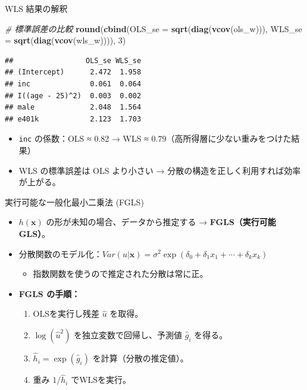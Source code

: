 \documentclass[
  ignorenonframetext,
]{beamer}
\newenvironment{Shaded}{\begin{snugshade}}{\end{snugshade}}
\newcommand{\AttributeTok}[1]{\textcolor[rgb]{0.13,0.29,0.53}{#1}}
\newcommand{\CommentTok}[1]{\textcolor[rgb]{0.56,0.35,0.01}{\textit{#1}}}
\newcommand{\DecValTok}[1]{\textcolor[rgb]{0.00,0.00,0.81}{#1}}
\newcommand{\FunctionTok}[1]{\textcolor[rgb]{0.13,0.29,0.53}{\textbf{#1}}}
\newcommand{\NormalTok}[1]{#1}
\providecommand{\tightlist}{%
  \setlength{\itemsep}{0pt}\setlength{\parskip}{0pt}}
\begin{document}
\begin{frame}[fragile]{WLS 結果の解釈}
\label{wls-ux7d50ux679cux306eux89e3ux91c8}
\footnotesize

\begin{Shaded}
\begin{Highlighting}[]
\CommentTok{\# 標準誤差の比較}
\FunctionTok{round}\NormalTok{(}\FunctionTok{cbind}\NormalTok{(}\AttributeTok{OLS\_se =} \FunctionTok{sqrt}\NormalTok{(}\FunctionTok{diag}\NormalTok{(}\FunctionTok{vcov}\NormalTok{(ols\_w))),}
            \AttributeTok{WLS\_se =} \FunctionTok{sqrt}\NormalTok{(}\FunctionTok{diag}\NormalTok{(}\FunctionTok{vcov}\NormalTok{(wls\_w)))), }\DecValTok{3}\NormalTok{)}
\end{Highlighting}
\end{Shaded}

\begin{verbatim}
##                 OLS_se WLS_se
## (Intercept)      2.472  1.958
## inc              0.061  0.064
## I((age - 25)^2)  0.003  0.002
## male             2.048  1.564
## e401k            2.123  1.703
\end{verbatim}

\normalsize

\begin{itemize}
\tightlist
\item
  \texttt{inc} の係数：OLS ≈ 0.82 → WLS ≈
  0.79（高所得層に少ない重みをつけた結果）
\item
  WLS の標準誤差は OLS より小さい →
  分散の構造を正しく利用すれば効率が上がる。
\end{itemize}
\end{frame}

\begin{frame}{実行可能な一般化最小二乗法 (FGLS)}
\label{ux5b9fux884cux53efux80fdux306aux4e00ux822cux5316ux6700ux5c0fux4e8cux4e57ux6cd5-fgls}
\begin{itemize}
\tightlist
\item
  \(h(\mathbf{x})\) の形が未知の場合、データから推定する →
  \textbf{FGLS（実行可能GLS）}。
\item
  分散関数のモデル化：\(Var(u|\mathbf{x}) = \sigma^2 \exp(\delta_0 + \delta_1 x_1 + \cdots + \delta_k x_k)\)

  \begin{itemize}
  \tightlist
  \item
    指数関数を使うので推定された分散は常に正。
  \end{itemize}
\item
  \textbf{FGLS の手順：}

  \begin{enumerate}
  \tightlist
  \item
    OLSを実行し残差 \(\hat{u}\) を取得。
  \item
    \(\log(\hat{u}^2)\) を独立変数で回帰し、予測値 \(\hat{g}_i\)
    を得る。
  \item
    \(\hat{h}_i = \exp(\hat{g}_i)\) を計算（分散の推定値）。
  \item
    重み \(1/\hat{h}_i\) でWLSを実行。
  \end{enumerate}
\end{itemize}
\end{frame}
\end{document}
